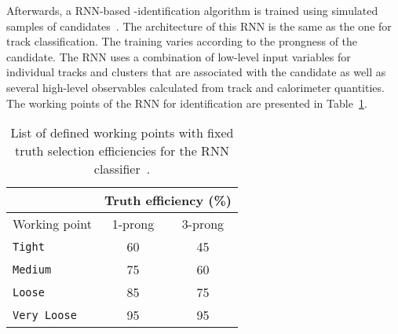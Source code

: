Afterwards, a RNN-based \Ptau-identification algorithm is trained using simulated samples of \tauhad candidates~\cite{ATLAS:2019uhp, ATL-PHYS-PUB-2022-044}. The architecture of this RNN is the same as the one for track classification. The training varies according to the prongness of the \tauhad candidate. The RNN uses a combination of low-level input variables for individual tracks and clusters that are associated with the \tauhad candidate as well as several high-level observables calculated from track and calorimeter quantities. The working points of the RNN for \tauhad identification are presented in Table~\ref{tab:Chap3:Reco:Tau:eff}.

\begin{table}[h]
\centering
\begin{tabular}{l|c|c}
\toprule
						& \multicolumn{2}{l}{Truth \tauhad  efficiency (\%)} \\ \midrule
 Working point				& 1-prong                 & 3-prong     	\\ \midrule
\texttt{Tight}                 		&  60                        &   45			\\
\texttt{Medium}                		&  75                        &   60			\\
\texttt{Loose}                 		&  85                        &   75			\\
\texttt{Very Loose}            		&  95                        &   95			\\
\bottomrule
\end{tabular}
\caption{List of defined working points with fixed truth \tauhad selection efficiencies for the RNN classifier~\cite{ATL-PHYS-PUB-2022-044}.}
\label{tab:Chap3:Reco:Tau:eff}
\end{table}



